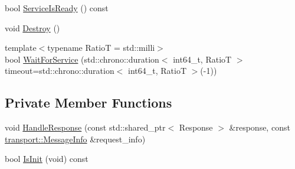 \begin{DoxyCompactItemize}
\item 
bool \hyperlink{classapollo_1_1cyber_1_1Client_a08a71d99f64374f6f06236848fbfe57c}{Service\-Is\-Ready} () const 
\item 
void \hyperlink{classapollo_1_1cyber_1_1Client_a7315a6cd9c733e844f0bd8e01006f491}{Destroy} ()
\item 
{\footnotesize template$<$typename Ratio\-T  = std\-::milli$>$ }\\bool \hyperlink{classapollo_1_1cyber_1_1Client_a374c271636f7f3a292f16845a37d825c}{Wait\-For\-Service} (std\-::chrono\-::duration$<$ int64\-\_\-t, Ratio\-T $>$ timeout=std\-::chrono\-::duration$<$ int64\-\_\-t, Ratio\-T $>$(-\/1))
\end{DoxyCompactItemize}
\subsection*{Private Member Functions}
\begin{DoxyCompactItemize}
\item 
void \hyperlink{classapollo_1_1cyber_1_1Client_a16d7df4f790876ca772e8c2d8b275ec3}{Handle\-Response} (const std\-::shared\-\_\-ptr$<$ Response $>$ \&response, const \hyperlink{classapollo_1_1cyber_1_1transport_1_1MessageInfo}{transport\-::\-Message\-Info} \&request\-\_\-info)
\item 
bool \hyperlink{classapollo_1_1cyber_1_1Client_aa7eccad0fe36e39ccefc3b74df4bed72}{Is\-Init} (void) const 
\end{DoxyCompactItemize}
